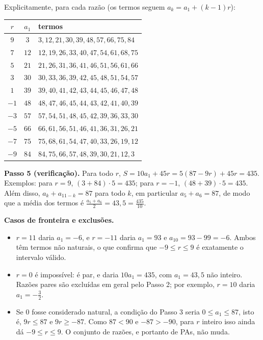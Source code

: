 \documentclass{article}%
\begin{document}
Explicitamente, para cada razão (os termos seguem $a_k = a_1 + (k-1)r$):

\begin{center}
\begin{tabular}{c|c|l}
$r$ & $a_1$ & termos \\ \hline
$9$ & $3$ & $3, 12, 21, 30, 39, 48, 57, 66, 75, 84$ \\
$7$ & $12$ & $12, 19, 26, 33, 40, 47, 54, 61, 68, 75$ \\
$5$ & $21$ & $21, 26, 31, 36, 41, 46, 51, 56, 61, 66$ \\
$3$ & $30$ & $30, 33, 36, 39, 42, 45, 48, 51, 54, 57$ \\
$1$ & $39$ & $39, 40, 41, 42, 43, 44, 45, 46, 47, 48$ \\
$-1$ & $48$ & $48, 47, 46, 45, 44, 43, 42, 41, 40, 39$ \\
$-3$ & $57$ & $57, 54, 51, 48, 45, 42, 39, 36, 33, 30$ \\
$-5$ & $66$ & $66, 61, 56, 51, 46, 41, 36, 31, 26, 21$ \\
$-7$ & $75$ & $75, 68, 61, 54, 47, 40, 33, 26, 19, 12$ \\
$-9$ & $84$ & $84, 75, 66, 57, 48, 39, 30, 21, 12, 3$
\end{tabular}
\end{center}

\textbf{Passo 5 (verificação).} Para todo $r$, $S = 10a_1 + 45r = 5(87 - 9r) + 45r = 435$. Exemplos: para $r = 9$, $(3 + 84)\cdot 5 = 435$; para $r = -1$, $(48 + 39)\cdot 5 = 435$. Além disso, $a_k + a_{11-k} = 87$ para todo $k$, em particular $a_5 + a_6 = 87$, de modo que a média dos termos é $\frac{a_5 + a_6}{2} = 43{,}5 = \frac{435}{10}$.

\textbf{Casos de fronteira e exclusões.}
\begin{itemize}
\item $r = 11$ daria $a_1 = -6$, e $r = -11$ daria $a_1 = 93$ e $a_{10} = 93 - 99 = -6$. Ambos têm termos não naturais, o que confirma que $-9 \leq r \leq 9$ é exatamente o intervalo válido.
\item $r = 0$ é impossível: é par, e daria $10a_1 = 435$, com $a_1 = 43{,}5$ não inteiro. Razões pares são excluídas em geral pelo Passo 2; por exemplo, $r = 10$ daria $a_1 = -\frac{3}{2}$.
\item Se $0$ fosse considerado natural, a condição do Passo 3 seria $0 \leq a_1 \leq 87$, isto é, $9r \leq 87$ e $9r \geq -87$. Como $87 < 90$ e $-87 > -90$, para $r$ inteiro isso ainda dá $-9 \leq r \leq 9$. O conjunto de razões, e portanto de PAs, não muda.
\end{itemize}
\end{document}
